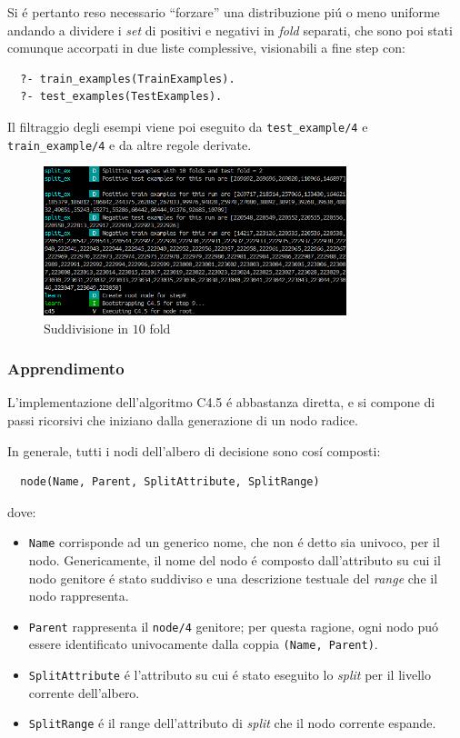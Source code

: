 \documentclass[preprint]{acm_proc_article-sp}
\begin{document}
Si \'e pertanto reso necessario ``forzare'' una distribuzione pi\'u o meno uniforme andando a dividere i \textit{set} di positivi e negativi in \textit{fold} separati, che sono poi stati comunque accorpati in due liste complessive, visionabili a fine step con:
\begin{verbatim}
  ?- train_examples(TrainExamples).
  ?- test_examples(TestExamples).
\end{verbatim}

Il filtraggio degli esempi viene poi eseguito da \verb|test_example/4| e \verb|train_example/4| e da altre regole derivate.

\begin{figure}[!htb]
\centering
\includegraphics[width=250pt]{figures/prolog-k-fold.png}
\caption{Suddivisione in $10$ fold}
\label{fig:prolog-k-fold}
\end{figure}

\subsubsection{Apprendimento}
L'implementazione dell'algoritmo C4.5 \'e abbastanza diretta, e si compone di passi ricorsivi che iniziano dalla generazione di un nodo radice.

In generale, tutti i nodi dell'albero di decisione sono cos\'i composti:
\begin{verbatim}
  node(Name, Parent, SplitAttribute, SplitRange)
\end{verbatim}
dove:
\begin{itemize}
\item \verb|Name| corrisponde ad un generico nome, che non \'e detto sia univoco, per il nodo. Genericamente, il nome del nodo \'e composto dall'attributo su cui il nodo genitore \'e stato suddiviso e una descrizione testuale del \textit{range} che il nodo rappresenta.
\item \verb|Parent| rappresenta il \verb|node/4| genitore; per questa ragione, ogni nodo pu\'o essere identificato univocamente dalla coppia \verb|(Name, Parent)|.
\item \verb|SplitAttribute| \'e l'attributo su cui \'e stato eseguito lo \textit{split} per il livello corrente dell'albero.
\item \verb|SplitRange| \'e il range dell'attributo di \textit{split} che il nodo corrente espande.
\end{itemize}
\end{document}
